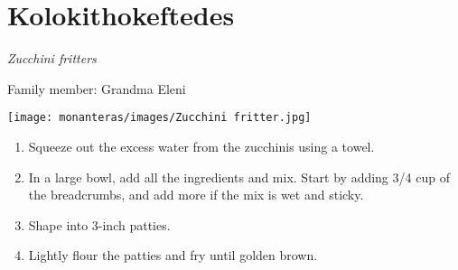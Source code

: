 \chapter{Kolokithokeftedes}
\label{ch:kolokithokeftedes}
\textit{Zucchini fritters}

Family member: Grandma Eleni

\begin{marginfigure}
  \texttt{[image: monanteras/images/Zucchini fritter.jpg]}
\end{marginfigure}


\begin{enumerate}
    \item Squeeze out the excess water from the zucchinis using a towel.
    \item In a large bowl, add all the ingredients and mix. Start by adding 3/4 cup of the breadcrumbs, and add more if the mix is wet and sticky.
    \item Shape into 3-inch patties.
    \item Lightly flour the patties and fry until golden brown.
\end{enumerate}

